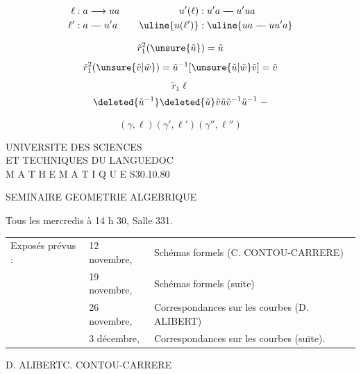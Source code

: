 \[
\begin{aligned}
\ell &: a\longrightarrow ua\\
\ell' &: a\mathbin{-\!\!-}u'a
\end{aligned}
\qquad
\begin{aligned}
u'(\ell)&:u'a\mathbin{-\!\!-}u'ua\\
\uline{u(\ell')}&:\uline{ua\mathbin{-\!\!-}uu'a}
\end{aligned}
\]


\[
\tilde r_1^2(\unsure{\tilde u})=\tilde u
\]
\[
\tilde r_1^2(\unsure{\tilde v|\tilde w})=\tilde u^{-1}[\unsure{\tilde u|\tilde w}\tilde v]=\tilde v
\]
\[
\tilde r_1\ell
\]
\[
\deleted{\tilde u^{-1}}\deleted{\tilde u}\tilde v\tilde u\tilde v^{-1}\tilde u^{-1}\;-
\]

\[
(\gamma,\ell)(\gamma',\ell')(\gamma'',\ell'')
\]

UNIVERSITE DES SCIENCES\\
ET TECHNIQUES DU LANGUEDOC\\
M A T H E M A T I Q U E S\hfill 30.10.80

\begin{center}
SEMINAIRE GEOMETRIE ALGEBRIQUE
\end{center}

Tous les mercredis à 14 h 30, Salle 331.

\begin{tabular}{lll}
Exposés prévus : & 12 novembre, & Schémas formels (C. CONTOU-CARRERE)\\
& 19 novembre, & Schémas formels (suite)\\
& 26 novembre, & Correspondances sur les courbes (D. ALIBERT)\\
& 3 décembre, & Correspondances sur les courbes (suite).
\end{tabular}

\begin{flushright}
D. ALIBERT\qquad C. CONTOU-CARRERE
\end{flushright}

